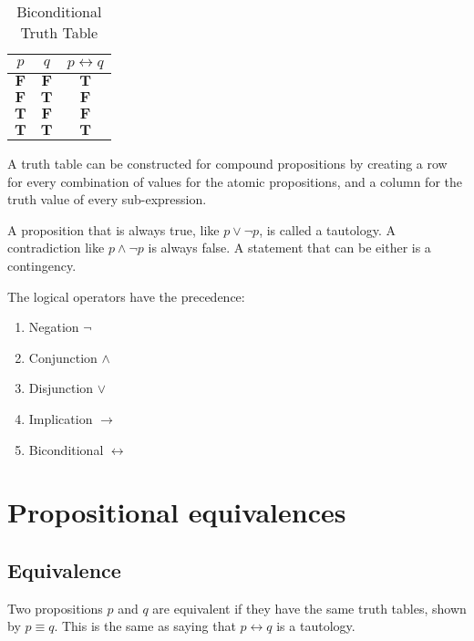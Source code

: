 \begin{table}[htbp]
    \centering
    \begin{tabular}{ccc}
        \toprule
        \(p\)          & \(q\)          & \(p \leftrightarrow q\) \\
        \midrule
        \(\mathbf{F}\) & \(\mathbf{F}\) & \(\mathbf{T}\)          \\
        \(\mathbf{F}\) & \(\mathbf{T}\) & \(\mathbf{F}\)          \\
        \(\mathbf{T}\) & \(\mathbf{F}\) & \(\mathbf{F}\)          \\
        \(\mathbf{T}\) & \(\mathbf{T}\) & \(\mathbf{T}\)          \\
        \bottomrule
    \end{tabular}
    \caption{Biconditional Truth Table}
\end{table}

A truth table can be constructed for compound propositions by creating a row for every combination of values for the atomic propositions, and a column for the truth value of every sub-expression.

A proposition that is always true, like \(p \lor \neg p\), is called a tautology. A contradiction like \(p \land \neg p\) is always false. A statement that can be either is a contingency.

The logical operators have the precedence:
\begin{enumerate}
    \item Negation \(\neg\)
    \item Conjunction \(\land\)
    \item Disjunction \(\lor\)
    \item Implication \(\rightarrow\)
    \item Biconditional \(\leftrightarrow\)
\end{enumerate}

\section{Propositional equivalences}

\subsection{Equivalence}
Two propositions \(p\) and \(q\) are equivalent if they have the same truth tables, shown by \(p \equiv q\). This is the same as saying that \(p \leftrightarrow q\) is a tautology.

